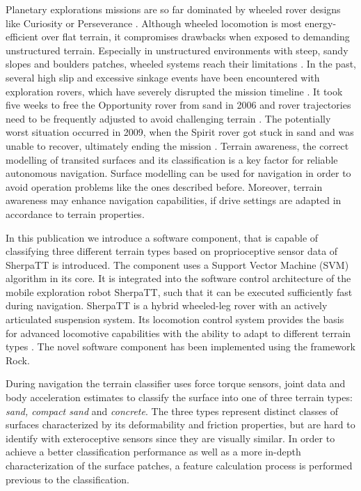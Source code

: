 \documentclass{article}
\begin{document}
Planetary explorations missions are so far dominated by wheeled rover designs like Curiosity
or Perseverance \cite{moeller2021, welch2013}. Although wheeled locomotion is most energy-efficient
over flat terrain, it compromises drawbacks when exposed to demanding unstructured
terrain. Especially in unstructured environments with steep, sandy slopes and boulders
patches, wheeled systems reach their limitations \cite{kolvenbach2021}. In the past, several high slip and
excessive sinkage events have been encountered with exploration rovers, which have severely
disrupted the mission timeline \cite{gonzalez2018}. It took five weeks to free the Opportunity
rover from sand in 2006 \cite{young2006} and rover trajectories need to be frequently adjusted to avoid
challenging terrain \cite{arvidson2017}. The potentially worst situation occurred in 2009, when the
Spirit rover got stuck in sand and was unable to recover, ultimately ending the mission
\cite{webster2009}. 
Terrain awareness, the correct modelling of transited surfaces and its classification is a key factor for reliable autonomous navigation. 
Surface modelling can be used for navigation in order to avoid operation problems like the ones described before. 
Moreover, terrain awareness may enhance navigation capabilities, if drive settings are adapted in accordance to terrain properties.

In this publication we introduce a software component, that is capable of classifying three different terrain types based on proprioceptive sensor data of SherpaTT is introduced. 
The component uses a Support Vector Machine (SVM) algorithm \cite{vapnik1992,cristianini2000} in its core. It is integrated into the software control architecture of the mobile exploration robot SherpaTT, such that it can be executed sufficiently fast during navigation. SherpaTT is a hybrid wheeled-leg rover with an actively articulated suspension system. Its locomotion control system provides the basis for advanced locomotive capabilities with the ability to adapt to different terrain types \cite{cordes2018}. 
The novel software component has been implemented using the framework Rock.


During navigation the terrain classifier uses force torque sensors, joint data and body acceleration estimates to classify the surface into one of three terrain types: \emph{sand, compact sand} and \emph{concrete}.
The three types represent distinct classes of surfaces characterized by its deformability and friction properties, but are hard to identify with exteroceptive sensors since they are visually similar.
In order to achieve a better classification performance as well as a more in-depth characterization of the surface patches, a feature calculation process is performed previous to the classification. 
\end{document}
